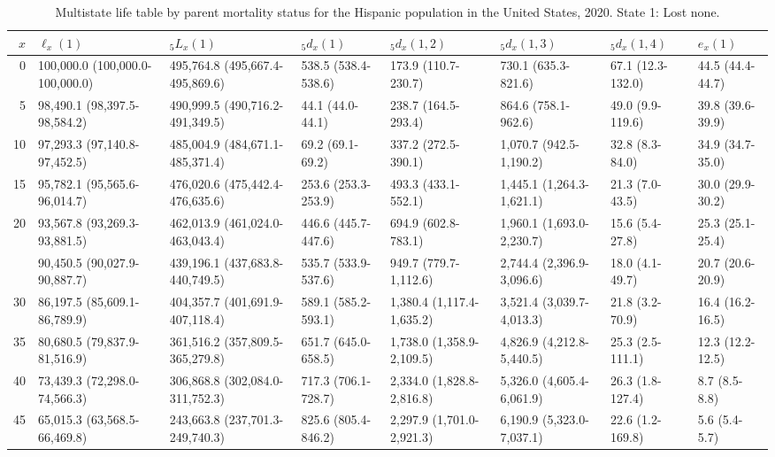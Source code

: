 \begin{table}

\caption{Multistate life table by parent mortality status for the Hispanic population in the United States, 2020. State 1: Lost none.}
\centering
\begin{tabular}[t]{rlllllll}
\toprule
$x$ & $\ell_x(1)$ & ${}_5 L_x(1)$ & ${}_5 d_x(1)$ & ${}_5 d_x(1,2)$ & ${}_5 d_x(1,3)$ & ${}_5 d_x(1,4)$ & $e_x(1)$\\
\midrule
0 & 100,000.0 (100,000.0-100,000.0) & 495,764.8 (495,667.4-495,869.6) & 538.5 (538.4-538.6) & 173.9 (110.7-230.7) & 730.1 (635.3-821.6) & 67.1 (12.3-132.0) & 44.5 (44.4-44.7)\\
5 & 98,490.1 (98,397.5-98,584.2) & 490,999.5 (490,716.2-491,349.5) & 44.1 (44.0-44.1) & 238.7 (164.5-293.4) & 864.6 (758.1-962.6) & 49.0 (9.9-119.6) & 39.8 (39.6-39.9)\\
10 & 97,293.3 (97,140.8-97,452.5) & 485,004.9 (484,671.1-485,371.4) & 69.2 (69.1-69.2) & 337.2 (272.5-390.1) & 1,070.7 (942.5-1,190.2) & 32.8 (8.3-84.0) & 34.9 (34.7-35.0)\\
15 & 95,782.1 (95,565.6-96,014.7) & 476,020.6 (475,442.4-476,635.6) & 253.6 (253.3-253.9) & 493.3 (433.1-552.1) & 1,445.1 (1,264.3-1,621.1) & 21.3 (7.0-43.5) & 30.0 (29.9-30.2)\\
20 & 93,567.8 (93,269.3-93,881.5) & 462,013.9 (461,024.0-463,043.4) & 446.6 (445.7-447.6) & 694.9 (602.8-783.1) & 1,960.1 (1,693.0-2,230.7) & 15.6 (5.4-27.8) & 25.3 (25.1-25.4)\\
\addlinespace
25 & 90,450.5 (90,027.9-90,887.7) & 439,196.1 (437,683.8-440,749.5) & 535.7 (533.9-537.6) & 949.7 (779.7-1,112.6) & 2,744.4 (2,396.9-3,096.6) & 18.0 (4.1-49.7) & 20.7 (20.6-20.9)\\
30 & 86,197.5 (85,609.1-86,789.9) & 404,357.7 (401,691.9-407,118.4) & 589.1 (585.2-593.1) & 1,380.4 (1,117.4-1,635.2) & 3,521.4 (3,039.7-4,013.3) & 21.8 (3.2-70.9) & 16.4 (16.2-16.5)\\
35 & 80,680.5 (79,837.9-81,516.9) & 361,516.2 (357,809.5-365,279.8) & 651.7 (645.0-658.5) & 1,738.0 (1,358.9-2,109.5) & 4,826.9 (4,212.8-5,440.5) & 25.3 (2.5-111.1) & 12.3 (12.2-12.5)\\
40 & 73,439.3 (72,298.0-74,566.3) & 306,868.8 (302,084.0-311,752.3) & 717.3 (706.1-728.7) & 2,334.0 (1,828.8-2,816.8) & 5,326.0 (4,605.4-6,061.9) & 26.3 (1.8-127.4) & 8.7 (8.5-8.8)\\
45 & 65,015.3 (63,568.5-66,469.8) & 243,663.8 (237,701.3-249,740.3) & 825.6 (805.4-846.2) & 2,297.9 (1,701.0-2,921.3) & 6,190.9 (5,323.0-7,037.1) & 22.6 (1.2-169.8) & 5.6 (5.4-5.7)\\

\end{tabular}
\end{table}
